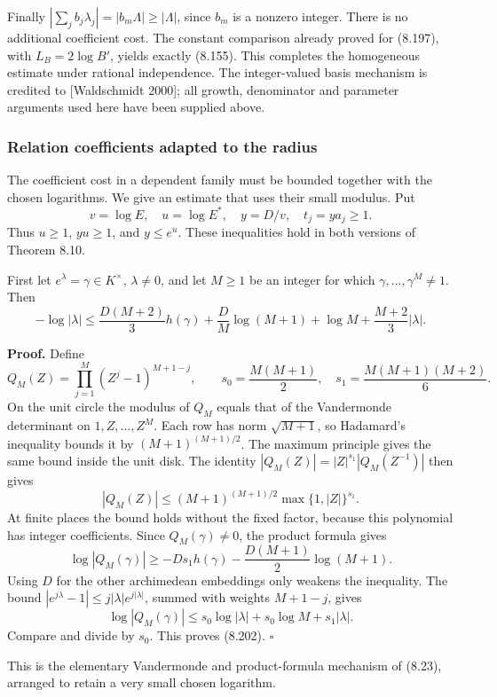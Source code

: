 \documentclass[
  11pt,
  a4paper,
]{article}
\begin{document}
Finally \(|\sum_jb_j\lambda_j|=|b_m\Lambda|\ge|\Lambda|\), since \(b_m\)
is a nonzero integer. There is no additional coefficient cost. The
constant comparison already proved for (8.197), with \(L_B=2\log B'\),
yields exactly (8.155). This completes the homogeneous estimate under
rational independence. The integer-valued basis mechanism is credited to
{[}Waldschmidt 2000{]}; all growth, denominator and parameter arguments
used here have been supplied above.

\subsubsection{Relation coefficients adapted to the
radius}\label{relation-coefficients-adapted-to-the-radius}

The coefficient cost in a dependent family must be bounded together with
the chosen logarithms. We give an estimate that uses their small
modulus. Put \[
v=\log E,\quad u=\log E^*,\quad y=D/v,\quad t_j=ya_j\ge1.
\] Thus \(u\ge1\), \(yu\ge1\), and \(y\le e^u\). These inequalities hold
in both versions of Theorem 8.10.

First let \(e^\lambda=\gamma\in K^\times\), \(\lambda\ne0\), and let
\(M\ge1\) be an integer for which \(\gamma,\ldots,\gamma^M\ne1\). Then
\[
-\log|\lambda|
\le\frac{D(M+2)}3h(\gamma)
+\frac D M\log(M+1)+\log M+\frac{M+2}3|\lambda|.
\tag{8.202}
\]

\textbf{Proof.} Define \[
Q_M(Z)=\prod_{j=1}^M(Z^j-1)^{M+1-j},\qquad
s_0=\frac{M(M+1)}2,\quad s_1=\frac{M(M+1)(M+2)}6.
\] On the unit circle the modulus of \(Q_M\) equals that of the
Vandermonde determinant on \(1,Z,\ldots,Z^M\). Each row has norm
\(\sqrt{M+1}\), so Hadamard's inequality bounds it by
\((M+1)^{(M+1)/2}\). The maximum principle gives the same bound inside
the unit disk. The identity \(|Q_M(Z)|=|Z|^{s_1}|Q_M(Z^{-1})|\) then
gives \[
|Q_M(Z)|\le(M+1)^{(M+1)/2}\max\{1,|Z|\}^{s_1}.
\] At finite places the bound holds without the fixed factor, because
this polynomial has integer coefficients. Since \(Q_M(\gamma)\ne0\), the
product formula gives \[
\log|Q_M(\gamma)|\ge-Ds_1h(\gamma)
-\frac{D(M+1)}2\log(M+1).
\] Using \(D\) for the other archimedean embeddings only weakens the
inequality. The bound \(|e^{j\lambda}-1|\le j|\lambda|e^{j|\lambda|}\),
summed with weights \(M+1-j\), gives \[
\log|Q_M(\gamma)|\le s_0\log|\lambda|+s_0\log M+s_1|\lambda|.
\] Compare and divide by \(s_0\). This proves (8.202). \(\square\)

This is the elementary Vandermonde and product-formula mechanism of
(8.23), arranged to retain a very small chosen logarithm.
\end{document}
